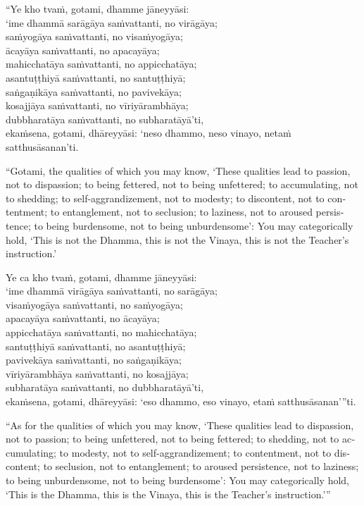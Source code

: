 “Ye kho tvaṁ, gotami, dhamme jāneyyāsi: \\
‘ime dhammā sarāgāya saṁvattanti, no virāgāya; \\
saṁyogāya saṁvattanti, no visaṁyogāya; \\
ācayāya saṁvattanti, no apacayāya; \\
mahicchatāya saṁvattanti, no appicchatāya; \\
asantuṭṭhiyā saṁvattanti, no santuṭṭhiyā; \\
saṅgaṇikāya saṁvattanti, no pavivekāya; \\
kosajjāya saṁvattanti, no vīriyārambhāya; \\
dubbharatāya saṁvattanti, no subharatāyā’ti, \\
ekaṁsena, gotami, dhāreyyāsi: ‘neso dhammo, neso vinayo, netaṁ satthusāsanan’ti.

\begin{english}
“Gotami, the qualities of which you may know, ‘These qualities lead to passion, not to dispassion; to being fettered, not to being unfettered; to accumulating, not to shedding; to self-aggrandizement, not to modesty; to discontent, not to contentment; to entanglement, not to seclusion; to laziness, not to aroused persistence; to being burdensome, not to being unburdensome’: You may categorically hold, ‘This is not the Dhamma, this is not the Vinaya, this is not the Teacher’s instruction.’
\end{english}

\clearpage

Ye ca kho tvaṁ, gotami, dhamme jāneyyāsi: \\
‘ime dhammā virāgāya saṁvattanti, no sarāgāya; \\
visaṁyogāya saṁvattanti, no saṁyogāya; \\
apacayāya saṁvattanti, no ācayāya; \\
appicchatāya saṁvattanti, no mahicchatāya; \\
santuṭṭhiyā saṁvattanti, no asantuṭṭhiyā; \\
pavivekāya saṁvattanti, no saṅgaṇikāya; \\
vīriyārambhāya saṁvattanti, no kosajjāya; \\
subharatāya saṁvattanti, no dubbharatāyā’ti, \\
ekaṁsena, gotami, dhāreyyāsi: ‘eso dhammo, eso vinayo, etaṁ satthusāsanan’”ti.

\begin{english}
  “As for the qualities of which you may know, ‘These qualities lead to dispassion, not to passion; to being unfettered, not to being fettered; to shedding, not to accumulating; to modesty, not to self-aggrandizement; to contentment, not to discontent; to seclusion, not to entanglement; to aroused persistence, not to laziness; to being unburdensome, not to being burdensome’: You may categorically hold, ‘This is the Dhamma, this is the Vinaya, this is the Teacher’s instruction.’”
\end{english}

